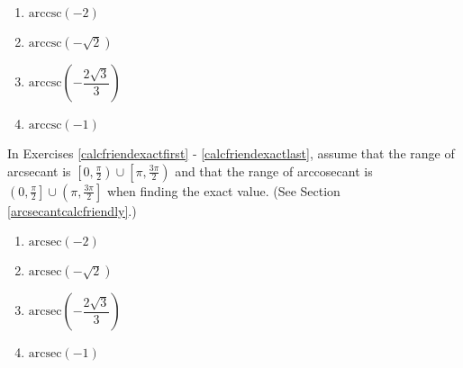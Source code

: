 \documentclass{ximera}
\begin{document}
\begin{multicols}{4}

\begin{enumerate}

\setcounter{enumi}{\value{HW}}

\item $\mbox{arccsc} \left( -2 \right)$  
\item $\mbox{arccsc} \left( -\sqrt{2} \right)$  
\item $\mbox{arccsc} \left( -\dfrac{2\sqrt{3}}{3} \right)$
\item $\mbox{arccsc} \left( -1 \right)$   \label{trigfriendexactlast}

\setcounter{HW}{\value{enumi}}

\end{enumerate}

\end{multicols}


\pagebreak

In Exercises \ref{calcfriendexactfirst} - \ref{calcfriendexactlast}, assume that the range of arcsecant is $\left[0, \frac{\pi}{2} \right) \cup \left[\pi, \frac{3\pi}{2} \right)$ and that the range of arccosecant is $\left(0, \frac{\pi}{2} \right] \cup \left( \pi, \frac{3\pi}{2} \right]$ when finding the exact value.  (See Section \ref{arcsecantcalcfriendly}.)


\begin{multicols}{4} 

\begin{enumerate}

\setcounter{enumi}{\value{HW}}

\item $\mbox{arcsec} \left( -2 \right)$  \label{calcfriendexactfirst}
\item $\mbox{arcsec} \left( -\sqrt{2} \right)$  
\item $\mbox{arcsec} \left( -\dfrac{2\sqrt{3}}{3} \right)$
\item $\mbox{arcsec} \left( -1 \right)$  

\setcounter{HW}{\value{enumi}}

\end{enumerate}

\end{multicols}
\end{document}
